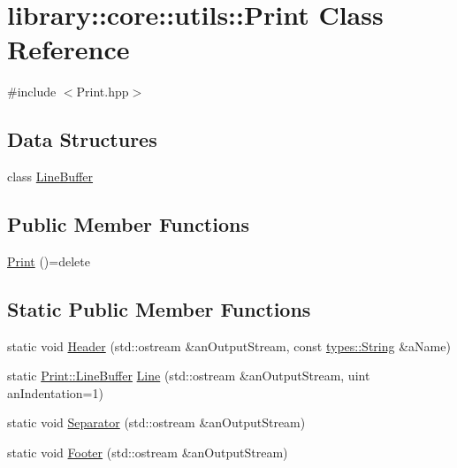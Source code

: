\hypertarget{classlibrary_1_1core_1_1utils_1_1Print}{}\section{library\+:\+:core\+:\+:utils\+:\+:Print Class Reference}
\label{classlibrary_1_1core_1_1utils_1_1Print}


{\ttfamily \#include $<$Print.\+hpp$>$}

\subsection*{Data Structures}
\begin{DoxyCompactItemize}
\item 
class \hyperlink{classlibrary_1_1core_1_1utils_1_1Print_1_1LineBuffer}{Line\+Buffer}
\end{DoxyCompactItemize}
\subsection*{Public Member Functions}
\begin{DoxyCompactItemize}
\item 
\hyperlink{classlibrary_1_1core_1_1utils_1_1Print_a2d7ca0fac9e9dc7fa8b8b40f7b784198}{Print} ()=delete
\end{DoxyCompactItemize}
\subsection*{Static Public Member Functions}
\begin{DoxyCompactItemize}
\item 
static void \hyperlink{classlibrary_1_1core_1_1utils_1_1Print_a828afa2d09d997e2ad5b5a93ab81bcb0}{Header} (std\+::ostream \&an\+Output\+Stream, const \hyperlink{classlibrary_1_1core_1_1types_1_1String}{types\+::\+String} \&a\+Name)
\item 
static \hyperlink{classlibrary_1_1core_1_1utils_1_1Print_1_1LineBuffer}{Print\+::\+Line\+Buffer} \hyperlink{classlibrary_1_1core_1_1utils_1_1Print_ab4d98c65fbb58213358df534dd1f6d65}{Line} (std\+::ostream \&an\+Output\+Stream, uint an\+Indentation=1)
\item 
static void \hyperlink{classlibrary_1_1core_1_1utils_1_1Print_a58361390194e28388d3ac0ec0910cc0c}{Separator} (std\+::ostream \&an\+Output\+Stream)
\item 
static void \hyperlink{classlibrary_1_1core_1_1utils_1_1Print_a5c9f1797eafda1b8e8ef95d5a2902df2}{Footer} (std\+::ostream \&an\+Output\+Stream)
\end{DoxyCompactItemize}


